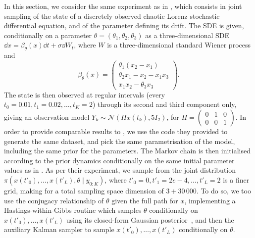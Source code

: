 In this section, we consider the same experiment as in \citet[Section 6.1]{mider2021continuous}, which consists in joint sampling of the state of a discretely observed chaotic Lorenz stochastic differential equation, and of the parameter defining its drift.
The SDE is given, conditionally on a parameter $\theta = (\theta_1, \theta_2, \theta_3)$ as a three-dimensional SDE $\dd{x} = \beta_{\theta}(x) \dd{t} + \sigma \dd{W_t}$,
where $W$ is a three-dimensional standard Wiener process and
\begin{equation}
    \beta_{\theta}(x) = \begin{pmatrix}
                            \theta_1 (x_2 - x_1) \\ \theta_2 x_1 - x_2 - x_1 x_3 \\ x_1 x_2 - \theta_3 x_3
    \end{pmatrix}.
\end{equation}
The state is then observed at regular intervals (every $t_0=0.01, t_1=0.02, \ldots, t_K=2$) through its second and third component only, giving an observation model $Y_k \sim \mathcal{N}(H x(t_k), 5 I_2)$, for $H=\begin{pmatrix}
                                                                                                                                                                                                                         0 & 1 & 0 \\ 0 & 0 & 1
\end{pmatrix}$. In order to provide comparable results to \citet{mider2021continuous}, we use the code they provided to generate the same dataset, and pick the same parametrisation of the model, including the same prior for the parameters. The Markov chain is then initialised according to the prior dynamics conditionally on the same initial parameter values as in \citet{mider2021continuous}. As per their experiment, we sample from the joint distribution $\pi(x(t'_0), \ldots, x(t'_L), \theta \mid y_{0:K})$, where $t'_0=0, t'_1=2e-4, \ldots, t'_L=2$ is a finer grid, making for a total sampling space dimension of $3 + 30\,000$. To do so, we too use the conjugacy relationship of $\theta$ given the full path for $x$, implementing a Hastings-within-Gibbs routine which samples $\theta$ conditionally on $x(t'_0), \ldots, x(t'_L)$ using its closed-form Gaussian posterior~\citet[Proposition 4.5]{mider2021continuous}, and then the auxiliary Kalman sampler to sample $x(t'_0), \ldots, x(t'_L)$ conditionally on $\theta$.

